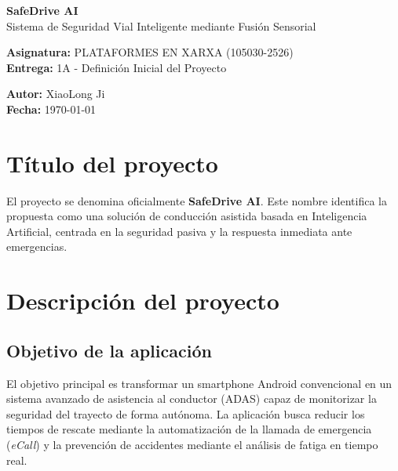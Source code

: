 \documentclass[11pt, a4paper]{article}
\begin{document}
    \begin{titlepage}
        \centering
        \vspace*{1cm}
        {\Huge \textbf{SafeDrive AI}} \\
        \vspace{0.5cm}
        {\Large Sistema de Seguridad Vial Inteligente mediante Fusión Sensorial} \\
        \vspace{2cm}

        \textbf{Asignatura:} PLATAFORMES EN XARXA (105030-2526) \\
        \textbf{Entrega:} 1A - Definición Inicial del Proyecto \\

        \vspace{3cm}


        \vfill
        \textbf{Autor:} XiaoLong Ji \\
        \textbf{Fecha:} \today
    \end{titlepage}

    \tableofcontents
    \newpage

    \section{Título del proyecto}
    El proyecto se denomina oficialmente \textbf{SafeDrive AI}. Este nombre identifica la propuesta como una solución de conducción asistida basada en Inteligencia Artificial, centrada en la seguridad pasiva y la respuesta inmediata ante emergencias.

    \section{Descripción del proyecto}

    \subsection{Objetivo de la aplicación}
    El objetivo principal es transformar un smartphone Android convencional en un sistema avanzado de asistencia al conductor (ADAS) capaz de monitorizar la seguridad del trayecto de forma autónoma. La aplicación busca reducir los tiempos de rescate mediante la automatización de la llamada de emergencia (\textit{eCall}) y la prevención de accidentes mediante el análisis de fatiga en tiempo real.
\end{document}
